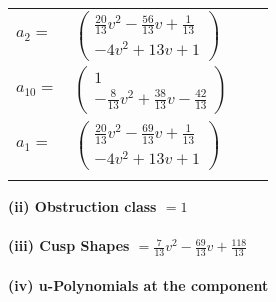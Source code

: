 \documentclass[1p]{elsarticle_modified}
\theoremstyle{definition}
\begin{document}
\begin{tabular}{m{7pt} m{180pt} m{7pt} m{180pt} }
\flushright $a_{2}=$&$\begin{pmatrix}\frac{20}{13} v^2-\frac{56}{13} v+\frac{1}{13}\\-4 v^2+13 v+1\end{pmatrix}$ \\
\flushright $a_{10}=$&$\begin{pmatrix}1\\-\frac{8}{13} v^2+\frac{38}{13} v-\frac{42}{13}\end{pmatrix}$ \\
\flushright $a_{1}=$&$\begin{pmatrix}\frac{20}{13} v^2-\frac{69}{13} v+\frac{1}{13}\\-4 v^2+13 v+1\end{pmatrix}$\\&\end{tabular}
\flushleft \textbf{(ii) Obstruction class $= 1$}\\~\\
\flushleft \textbf{(iii) Cusp Shapes $= \frac{7}{13} v^2-\frac{69}{13} v+\frac{118}{13}$}\\~\\
\newpage\renewcommand{\arraystretch}{1}
\flushleft \textbf{(iv) u-Polynomials at the component}\newline \\
\end{document}
